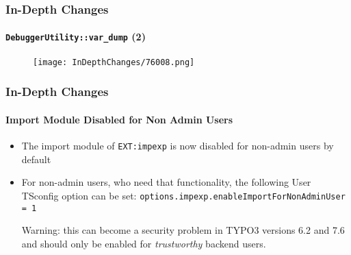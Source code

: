 \begin{frame}[fragile]
	\frametitle{In-Depth Changes}
	\framesubtitle{\texttt{DebuggerUtility::var\_dump} (2)}

	\begin{figure}
		\texttt{[image: InDepthChanges/76008.png]}
	\end{figure}

\end{frame}

\begin{frame}[fragile]
	\frametitle{In-Depth Changes}
	\framesubtitle{Import Module Disabled for Non Admin Users}

	\begin{itemize}

		\item The import module of \texttt{EXT:impexp} is now disabled for non-admin users by default

		\item For non-admin users, who need that functionality, the following User TSconfig option
			can be set:\newline
			\texttt{options.impexp.enableImportForNonAdminUser = 1}

			\vspace{0.5cm}

			\begingroup
				\color{typo3red}
				Warning: this can become a security problem in TYPO3 versions 6.2 and 7.6
				and should only be enabled for \textit{trustworthy} backend users.
			\endgroup

	\end{itemize}

\end{frame}

